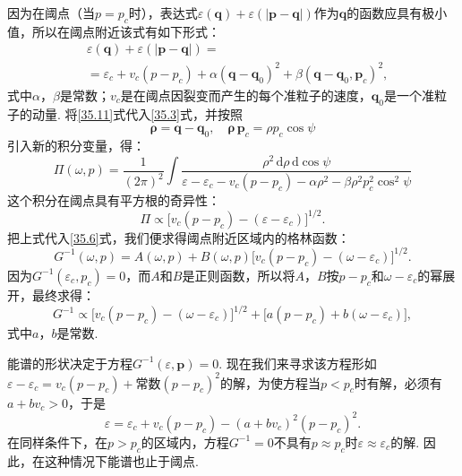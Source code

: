 因为在阈点（当$p=p_{c}$时），表达式$\varepsilon(\bm{q})+\varepsilon(|\bm{p}-\bm{q}|)$作为$\bm{q}$的函数应具有极小值，所以在阈点附近该式有如下形式：
\begin{equation}
\begin{aligned}
&\varepsilon(\bm{q})+\varepsilon(|\bm{p}-\bm{q}|)={}\\
&=\varepsilon_{c}+v_{c}(p-p_{c})
+\alpha(\bm{q}-\bm{q}_{0})^{2}
+\beta(\bm{q}-\bm{q}_{0},\bm{p}_{c})^{2},
\end{aligned}
\label{35.11}
\end{equation}
式中$\alpha$，$\beta$是常数；$v_{c}$是在阈点因裂变而产生的每个准粒子的速度，$\bm{q}_{0}$是一个准粒子的动量. 将\eqref{35.11}式代入\eqref{35.3}式，并按照
\begin{equation*}
\bm{\rho}=\bm{q}-\bm{q}_{0},\quad
\bm{\rho}\,\bm{p}_{c}=\rho p_{c}\cos\psi
\end{equation*}
引入新的积分变量，得：
\begin{equation*}
\Pi(\omega,p)=\frac{1}{(2\pi)^{2}}\int
\frac{\rho^{2}\,\mathrm{d}\rho\,\mathrm{d}\cos\psi}
{\varepsilon-\varepsilon_{c}-v_{c}(p-p_{c})-\alpha\rho^{2}-\beta\rho^{2}p_{c}^{2}\cos^{2}\psi}
\end{equation*}
这个积分在阈点具有平方根的奇异性：
\begin{equation}
\Pi\propto\big[v_{c}(p-p_{c})-(\varepsilon-\varepsilon_{c})\big]^{1/2}.
\label{35.12}
\end{equation}
把上式代入\eqref{35.6}式，我们便求得阈点附近区域内的格林函数：
\begin{equation*}
G^{-1}(\omega,p)=A(\omega,p)+B(\omega,p)
\big[v_{c}(p-p_{c})-(\omega-\varepsilon_{c})\big]^{1/2}.
\end{equation*}
因为$G^{-1}(\varepsilon_{c},p_{c})=0$，而$A$和$B$是正则函数，所以将$A$，$B$按$p-p_{c}$和$\omega-\varepsilon_{c}$的幂展开，最终求得：
\begin{equation}
G^{-1}\propto\big[v_{c}(p-p_{c})-(\omega-\varepsilon_{c})\big]^{1/2}
+\big[a(p-p_{c})+b(\omega-\varepsilon_{c})\big],
\label{35.13}
\end{equation}
式中$a$，$b$是常数.

能谱的形状决定于方程$G^{-1}(\varepsilon,\bm{p})=0$. 现在我们来寻求该方程形如$\varepsilon-\varepsilon_{c}=v_{c}(p-p_{c})+$常数$(p-p_{c})^{2}$的解，为使方程当$p<p_{c}$时有解，必须有$a+bv_{c}>0$，于是
\begin{equation}
\varepsilon=\varepsilon_{c}+v_{c}(p-p_{c})-(a+bv_{c})^{2}(p-p_{c})^{2}.
\label{35.14}
\end{equation}
在同样条件下，在$p>p_{c}$的区域内，方程$G^{-1}=0$不具有$p\approx p_{c}$时$\varepsilon\approx\varepsilon_{c}$的解. 因此，在这种情况下能谱也止于阈点.

